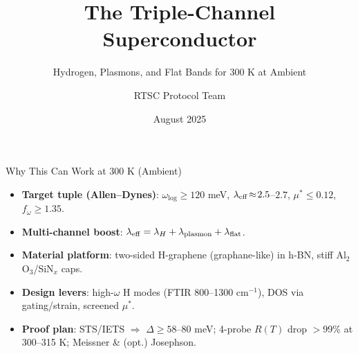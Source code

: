 \documentclass[aspectratio=169]{beamer}
\title{The Triple-Channel Superconductor}
\subtitle{Hydrogen, Plasmons, and Flat Bands for 300 K at Ambient}
\author{RTSC Protocol Team}
\date{August 2025}
\begin{document}
\begin{frame}
  \titlepage
\end{frame}

\begin{frame}{Why This Can Work at 300 K (Ambient)}
\begin{itemize}
  \item \textbf{Target tuple (Allen--Dynes)}: $\omega_{\log}\!\ge\!120$ meV,\; $\lambda_{\rm eff}\!\approx\!2.5$--$2.7$,\; $\mu^*\!\le\!0.12$,\; $f_\omega\!\ge\!1.35$.
  \item \textbf{Multi-channel boost}: $\lambda_{\rm eff}=\lambda_H+\lambda_{\rm plasmon}+\lambda_{\rm flat}$.
  \item \textbf{Material platform}: two-sided H-graphene (graphane-like) in h-BN, stiff Al$_2$O$_3$/SiN$_x$ caps.
  \item \textbf{Design levers}: high-$\omega$ H modes (FTIR 800--1300 cm$^{-1}$), DOS via gating/strain, screened $\mu^*$.
  \item \textbf{Proof plan}: STS/IETS $\Rightarrow$ $\Delta\ge58$--80 meV; 4-probe $R(T)$ drop $>$99\% at 300--315 K; Meissner \& (opt.) Josephson.
\end{itemize}
\end{frame}
\end{document}
